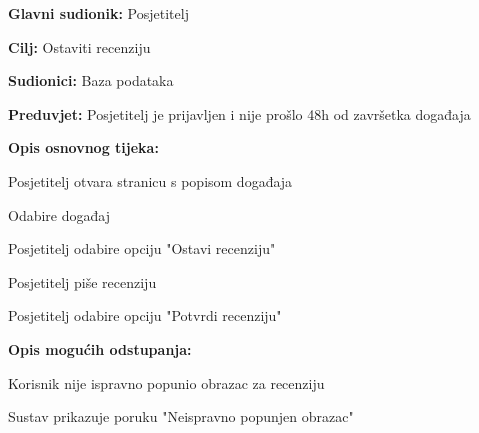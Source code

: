					\noindent {}
					\begin{packed_item}
	
						\item \textbf{Glavni sudionik:} Posjetitelj
						\item  \textbf{Cilj:} Ostaviti recenziju
						\item  \textbf{Sudionici:} Baza podataka
						\item  \textbf{Preduvjet:} Posjetitelj je prijavljen i nije prošlo 48h od završetka događaja

						\item  \textbf{Opis osnovnog tijeka:}
						
						\item[] \begin{packed_enum}
	
							\item Posjetitelj otvara stranicu s popisom događaja
							\item Odabire događaj
							\item Posjetitelj odabire opciju "Ostavi recenziju"
							\item Posjetitelj piše recenziju
							\item Posjetitelj odabire opciju "Potvrdi recenziju"
							
						\end{packed_enum}
						
						\item  \textbf{Opis mogućih odstupanja:}
						
						\item[] \begin{packed_item}
	
							\item[5.a] Korisnik nije ispravno popunio obrazac za recenziju
							\begin{packed_enum}
								\item Sustav prikazuje poruku "Neispravno popunjen obrazac"
							\end{packed_enum}
							
						\end{packed_item}
					\end{packed_item}

